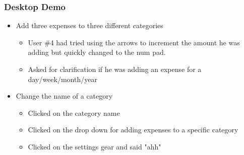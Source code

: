 \documentclass{chi2011}
\begin{document}
\begin{itemize}[noitemsep]
	\subsubsection{Desktop Demo}
	\begin{itemize}[noitemsep] 
		\item Add three expenses to three different categories
		\begin{itemize}[noitemsep]
			\item User \#4 had tried using the arrows to increment the amount he was adding but quickly 
				  changed to the num pad.
			\item Asked for clarification if he was adding an expense for a day/week/month/year 
		\end{itemize}
		\item Change the name of a category
		\begin{itemize}[noitemsep]
			\item Clicked on the category name
			\item Clicked on the drop down for adding expenses to a specific category
			\item Clicked on the settings gear and said "ahh"
		\end{itemize}
	\end{itemize}
	

\end{itemize}
\end{document}
